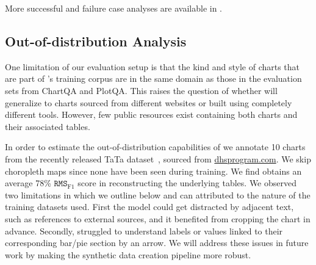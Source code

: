 More successful and failure case analyses are available in .

\subsection{Out-of-distribution Analysis}\label{sec:ood}

One limitation of our evaluation setup is that the kind and style of charts that are part of \model{}'s training corpus are in the same domain as those in the evaluation sets from ChartQA and PlotQA.
This raises the question of whether \model{} will generalize to charts sourced from different websites or built using completely different tools.
However, few public resources exist containing both charts and their associated tables. 

In order to estimate the out-of-distribution capabilities of \model{} we annotate 10 charts from the recently released TaTa dataset~\cite{gehrmann2022tata}, sourced from \url{dhsprogram.com}. We skip choropleth maps since none have been seen during training. We find \model{} obtains an average 78\% $\texttt{RMS}_{\text{F1}}$ score in reconstructing the underlying tables. 
We observed two limitations in \model{} which we outline below and can attributed to the nature of the training datasets used. 
First the model could get distracted by adjacent text, such as references to external sources, and it benefited from cropping the chart in advance.
Secondly, \model{} struggled to understand labels or values linked to their corresponding bar/pie section by an arrow.
We will address these issues in future work by making the synthetic data creation pipeline more robust.